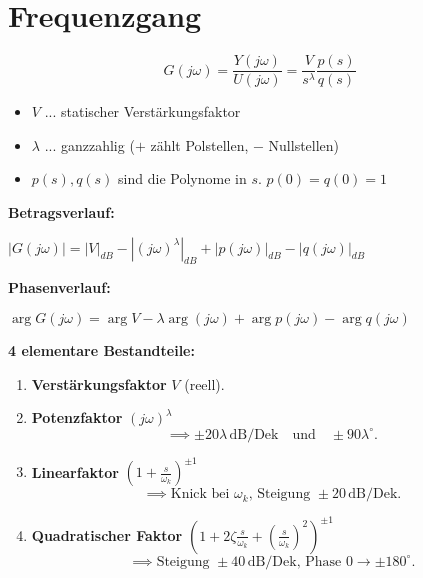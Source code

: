 \documentclass[german]{latex4ei/latex4ei_sheet}
\begin{document}
\section{Frequenzgang}
\begin{sectionbox}
    \[
        G(j\omega) = \frac{Y(j\omega)}{U(j\omega)} = \frac{V}{s^{\lambda}} \frac{p(s)}{q(s)}
    \]
    \begin{itemize}
        \item $V$ ... statischer Verstärkungsfaktor
        \item $λ$ ... ganzzahlig ($+$ zählt Polstellen, $−$ Nullstellen)
        \item $p(s),q(s)$ sind die Polynome in $s$. $p(0)=q(0) = 1$
    \end{itemize}
    \vspace{2mm}

    \textbf{Betragsverlauf:}
    \begin{center} 
        $|G(j\omega)| = |V|_{dB} - |(j\omega)^{\lambda}|_{dB} + |p(j\omega)|_{dB} - |q(j\omega)|_{dB}$
    \end{center}

    \textbf{Phasenverlauf:}
    \begin{center} 
        $\arg G(j\omega) = \arg V - \lambda \arg(j\omega) + \arg p(j\omega) - \arg q(j\omega)$
    \end{center}

    \vspace{3mm}
    \textbf{4 elementare Bestandteile:}
    \begin{enumerate}
    \item \textbf{Verstärkungsfaktor} \(V\) (reell).
    
    \item \textbf{Potenzfaktor} \((j\omega)^{\lambda}\) 
    \[
    \implies \pm 20\lambda \, \text{dB/Dek} \quad \text{und} \quad \pm 90\lambda^\circ.
    \]

    \item \textbf{Linearfaktor} \(\left( 1 + \frac{s}{\omega_k} \right)^{\pm 1}\) 
    \[
    \implies \text{Knick bei } \omega_k, \, \text{Steigung } \pm 20 \, \text{dB/Dek}.
    \]

    \item \textbf{Quadratischer Faktor} \(\left( 1 + 2\zeta \frac{s}{\omega_k} + \left(\frac{s}{\omega_k}\right)^2 \right)^{\pm 1}\) 
    \[
    \implies \text{Steigung } \pm 40 \, \text{dB/Dek}, \, \text{Phase } 0 \to \pm 180^\circ.
    \]
\end{enumerate}

\end{sectionbox}
\end{document}
